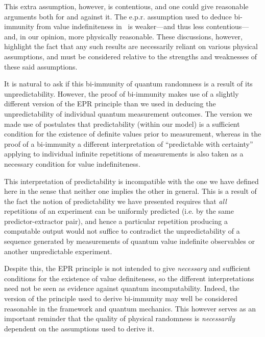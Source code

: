 \documentclass[%
 superscriptaddress,
 preprint,
 showpacs,
 showkeys,
 preprintnumbers,
 nofootinbib,
  amsmath,amssymb,
  aps,
 pra,
  longbibliography,
  floatfix,
 ]{revtex4-1}
\theoremstyle{definition}
\begin{document}
This extra assumption, however, is contentious, and one could give reasonable arguments both for and against it.
The e.p.r. assumption used to deduce bi-immunity from value indefiniteness in~\cite{2012-incomput-proofsCJ} is weaker---and thus less contentious---and, in our opinion, more physically reasonable.
These discussions, however, highlight the fact that any such results are necessarily reliant on various physical assumptions, and must be considered relative to the strengths and weaknesses of these said assumptions.
\fi

{\color{green} 
It is natural to ask if this bi-immunity of quantum randomness is a result of its unpredictability.
However, the proof of bi-immunity makes use of a slightly different version of the EPR principle than we used in deducing the unpredictability of individual quantum measurement outcomes.
The version we made use of postulates that predictability (within our model) is a sufficient condition for the existence of definite values prior to measurement, whereas in the proof of a bi-immunity a different interpretation of ``predictable with certainty'' applying to individual infinite repetitions of measurements is also taken as a necessary condition for value indefiniteness.

This interpretation of predictability is incompatible with the one we have defined here in the sense that neither one implies the other in general.
This is a result of the fact the notion of predictability we have presented requires that \emph{all} repetitions of an experiment can be uniformly predicted (i.e. by the same predictor-extractor pair), and hence a particular repetition producing a computable output would not suffice to contradict the unpredictability of a sequence generated by measurements of quantum value indefinite observables or another unpredictable experiment.

Despite this, the EPR principle is not intended to give \emph{necessary} and sufficient conditions for the existence of value definiteness, so the different interpretations need not be seen as evidence against quantum incomputability.
Indeed, the version of the principle used to derive bi-immunity may well be considered reasonable in the framework and quantum mechanics.
This however serves as an important reminder that the quality of physical randomness is \emph{necessarily} dependent on the assumptions used to derive it.}
\fi


\end{document}

